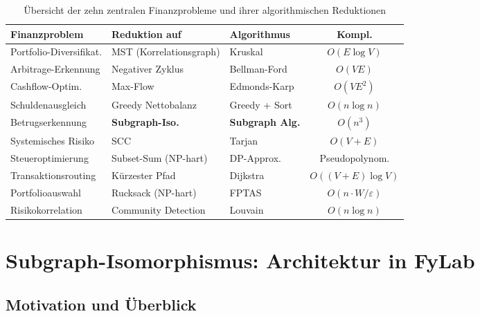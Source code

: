 \documentclass[a4paper,12pt]{article}
\begin{document}
\begin{table}[h]
    \centering
    \begin{tabular}{@{}lllc@{}}
        \toprule
        \textbf{Finanzproblem} & \textbf{Reduktion auf} & \textbf{Algorithmus}
        & \textbf{Kompl.} \\
        \midrule
        Portfolio-Diversifikat.  & MST (Korrelationsgraph)   & Kruskal
        & $O(E \log V)$          \\
        Arbitrage-Erkennung        & Negativer Zyklus          & Bellman-Ford
        & $O(VE)$                \\
        Cashflow-Optim.       & Max-Flow                  & Edmonds-Karp
        & $O(VE^2)$              \\
        Schuldenausgleich          & Greedy Nettobalanz        & Greedy + Sort
        & $O(n \log n)$          \\
        Betrugserkennung           & \textbf{Subgraph-Iso.}    & \textbf{Subgraph Alg.}
        & $O(n^3)$               \\
        Systemisches Risiko        & SCC                       & Tarjan
        & $O(V+E)$               \\
        Steueroptimierung          & Subset-Sum (NP-hart)      & DP-Approx.
        & Pseudopolynom.         \\
        Transaktionsrouting        & Kürzester Pfad            & Dijkstra
        & $O((V+E)\log V)$       \\
        Portfolioauswahl           & Rucksack (NP-hart)        & FPTAS
        & $O(n \cdot W/\varepsilon)$ \\
        Risikokorrelation          & Community Detection       & Louvain
        & $O(n \log n)$          \\
        \bottomrule
    \end{tabular}
    \caption{Übersicht der zehn zentralen Finanzprobleme und ihrer
    algorithmischen Reduktionen}
    \label{tab:probleme}
\end{table}

\section{Subgraph-Isomorphismus: Architektur in FyLab}
\label{sec:subgraph}

\subsection{Motivation und Überblick}
\end{document}

